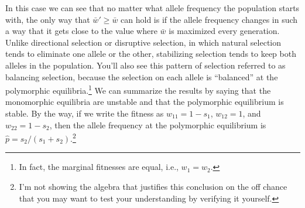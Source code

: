 In this case we can see that no matter what allele frequency the
population starts with, the only way that $\bar w' \ge \bar w$ can
hold is if the allele frequency changes in such a way that it gets
close to the value where $\bar w$ is maximized every
generation. Unlike directional selection or disruptive selection, in
which natural selection tends to eliminate one allele or the other,
stabilizing selection tends to keep both alleles in the
population. You'll also see this pattern of selection referred to as
balancing selection, because the selection on each allele is
``balanced'' at the polymorphic equilibria.\footnote{In fact, the
  marginal fitnesses are equal, i.e., $w_1=w_2$.} We can summarize the
results by saying that the monomorphic equilibria are unstable and
that the polymorphic equilibrium is stable. By the way, if we write
the fitness as $w_{11} = 1 - s_1$, $w_{12}=1$, and $w_{22}=1-s_2$,
then the allele frequency at the polymorphic equilibrium is $\hat
p=s_2/(s_1+s_2)$.\footnote{I'm not showing the algebra that justifies
  this conclusion on the off chance that you may want to test your
  understanding by verifying it yourself.}


